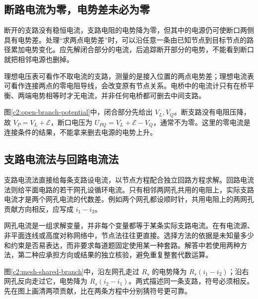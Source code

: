 \subsection{断路电流为零，电势差未必为零}

断开的支路没有稳恒电流，支路电阻的电势降为零，但其中的电源仍可使断口两侧具有电势差。处理“求两点电势差”时，可以沿任意一条由已知节点到目标节点的路径累加电势变化。应先解闭合部分的电流，后追踪断开部分的电势，不能看到断口就把相邻电源也删掉。

理想电压表可看作不取电流的支路，测量的是接入位置的两点电势差；理想电流表可看作连接两点的零电阻导线，会改变原有节点关系。电桥中的电流计只有在桥平衡、两端电势相等时才无电流，并非任何电桥都可删去中间支路。

图\ref{c2:open-branch-potential}中，闭合部分先给出 $V_L,V_Q$。断支路没有电阻压降，故 $V_P=V_L+\mathcal E$，断口电压为 $U_{PQ}=V_L+\mathcal E-V_Q$，通常不为零。这里的零电流是连接条件的结果，不能拿来删去电源的电势上升。

\subsection{支路电流法与回路电流法}

支路电流法直接给每条支路设电流，以节点方程配合独立回路方程求解。回路电流法则给平面电路的若干网孔设循环电流。只有相邻两网孔共用的电阻上，实际支路电流才是两个网孔电流的代数差。例如两个网孔都设顺时针，共用电阻上的两网孔贡献方向相反，应写成 $i_1-i_2$。

网孔电流是一组求解变量，并非每个变量都等于某条实际支路电流。在有电流源、非平面连线或高度对称网络中，节点法往往更直接。选择方法的依据是未知量多少和约束是否易表达，而非要求每道题固定使用某一种套路。解答中若使用两种方法，第二种应承担方向或结果的独立核验，避免重复整套代数运算。


图\ref{c2:mesh-shared-branch}中，沿左网孔走过 $R_s$ 的电势降为 $R_s(i_1-i_2)$；沿右网孔反向走过它，电势降为 $R_s(i_2-i_1)$。两式描述同一条支路，符号必须相反。先在图上画清两项贡献，比在两条方程中分别猜符号更可靠。

